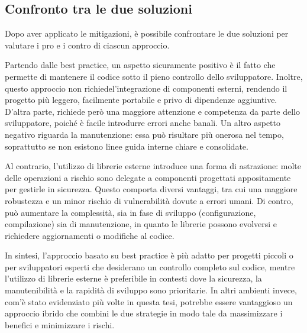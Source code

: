 \subsection*{Confronto tra le due soluzioni}
\label{sec:comparison-case-study}

Dopo aver applicato le mitigazioni, è possibile confrontare le due soluzioni per
valutare i pro e i contro di ciascun approccio.

Partendo dalle best practice, un aspetto sicuramente positivo è il fatto che permette
di mantenere il codice sotto il pieno controllo dello sviluppatore. Inoltre, questo
approccio non richiedel'integrazione di componenti esterni, rendendo il progetto
più leggero, facilmente portabile e privo di dipendenze aggiuntive. D'altra
parte, richiede però una maggiore attenzione e competenza da parte dello sviluppatore,
poiché è facile introdurre errori anche banali. Un altro aspetto negativo riguarda
la manutenzione: essa può risultare più onerosa nel tempo, soprattutto se non esistono
linee guida interne chiare e consolidate.

Al contrario, l'utilizzo di librerie esterne introduce una forma di astrazione: molte
delle operazioni a rischio sono delegate a componenti progettati appositamente per
gestirle in sicurezza. Questo comporta diversi vantaggi, tra cui una maggiore robustezza
e un minor rischio di vulnerabilità dovute a errori umani. Di contro, può aumentare
la complessità, sia in fase di sviluppo (configurazione, compilazione) sia di manutenzione,
in quanto le librerie possono evolversi e richiedere aggiornamenti o modifiche
al codice.

In sintesi, l'approccio basato su best practice è più adatto per progetti piccoli
o per sviluppatori esperti che desiderano un controllo completo sul codice,
mentre l'utilizzo di librerie esterne è preferibile in contesti dove la
sicurezza, la manutenibilità e la rapidità di sviluppo sono prioritarie. In
altri ambienti invece, com'è stato evidenziato più volte in questa tesi,
potrebbe essere vantaggioso un approccio ibrido che combini le due strategie in
modo tale da massimizzare i benefici e minimizzare i rischi.